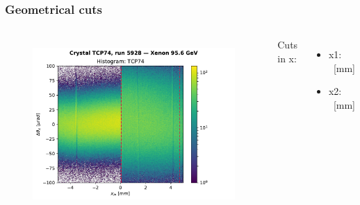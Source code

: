 \documentclass[10pt]{beamer}
\begin{document}
% 
% 
% 


\begin{frame}
\frametitle{Geometrical cuts}


\begin{columns}[c] %

\begin{figure}
\includegraphics[width=\linewidth]{geocuts.pdf}\\
\end{figure}

Cuts in x:
\begin{itemize}[leftmargin=*]
 \item x1: \xmin\ [mm]
 \item x2: \xmax\ [mm]
\end{itemize}

\end{columns}
\end{frame}
\end{document}
